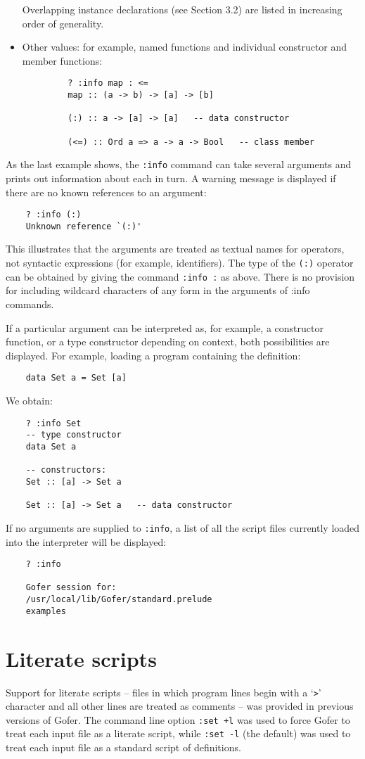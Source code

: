 \begin{itemize}
     Overlapping instance declarations (see Section 3.2) are listed in
     increasing order of generality.

\item  Other values: for example, named functions and individual
     constructor and member functions:
\begin{verbatim}
         ? :info map : <=
         map :: (a -> b) -> [a] -> [b]

         (:) :: a -> [a] -> [a]   -- data constructor

         (<=) :: Ord a => a -> a -> Bool   -- class member
\end{verbatim}
\end{itemize}
As the last example shows, the \verb":info" command can take several arguments
and prints out information about each in turn.  A warning message is
displayed if there are no known references to an argument:
\begin{verbatim}
    ? :info (:)
    Unknown reference `(:)'
\end{verbatim}
This illustrates that the arguments are treated as textual names for
operators, not syntactic expressions (for example, identifiers). The
type of the \verb"(:)" operator can be obtained by giving the command \verb":info :"
as above.  There is no provision for including wildcard characters of
any form in the arguments of :info commands.

If a particular argument can be interpreted as, for example, a
constructor function, or a type constructor depending on context, both
possibilities are displayed.  For example, loading a program containing
the definition:
\begin{verbatim}
    data Set a = Set [a]
\end{verbatim}
We obtain:
\begin{verbatim}
    ? :info Set        
    -- type constructor
    data Set a

    -- constructors:
    Set :: [a] -> Set a

    Set :: [a] -> Set a   -- data constructor
\end{verbatim}
If no arguments are supplied to \verb":info", a list of all the script files
currently loaded into the interpreter will be displayed:
\begin{verbatim}
    ? :info

    Gofer session for:
    /usr/local/lib/Gofer/standard.prelude
    examples
\end{verbatim}


\section{Literate scripts}
Support for literate scripts -- files in which program lines begin with
a `\verb">"' character and all other lines are treated as comments -- was
provided in previous versions of Gofer.  The command line option
\verb":set +l" was used to force Gofer to treat each input file as a literate
script, while \verb":set -l" (the default) was used to treat each input file
as a standard script of definitions.

